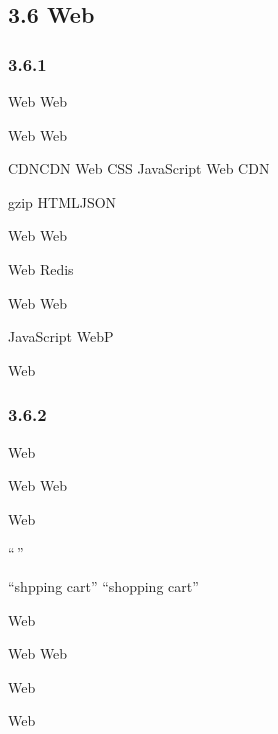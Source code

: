 \hypertarget{web}{%
\subsection{3.6 Web}\label{web}}

\hypertarget{section-49}{%
\subsubsection{3.6.1}\label{section-49}}

Web Web


Web Web

CDNCDN Web CSS JavaScript Web CDN

gzip HTMLJSON


Web Web

Web Redis


Web Web

JavaScript WebP

Web

\hypertarget{section-50}{%
\subsubsection{3.6.2}\label{section-50}}

Web



Web Web

Web


``\,''

``shpping cart'' ``shopping cart''



Web


Web Web

Web


Web

\hypertarget{section-51}{%
\subsection{}\label{section-51}}

\hypertarget{section-52}{%
\subsubsection{}\label{section-52}}

